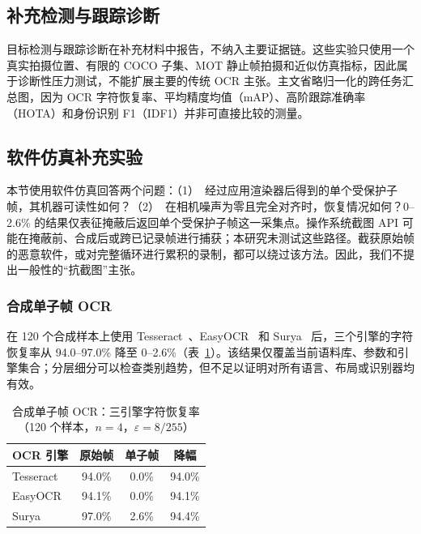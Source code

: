 \documentclass{ieeeaccess}
\begin{document}
\subsection{补充检测与跟踪诊断}

目标检测与跟踪诊断在补充材料中报告，不纳入主要证据链。这些实验只使用一个真实拍摄位置、有限的 COCO 子集、MOT 静止帧拍摄和近似仿真指标，因此属于诊断性压力测试，不能扩展主要的传统 OCR 主张。主文省略归一化的跨任务汇总图，因为 OCR 字符恢复率、平均精度均值（mAP）、高阶跟踪准确率（HOTA）和身份识别 F1（IDF1）并非可直接比较的测量。

\subsection{软件仿真补充实验}

本节使用软件仿真回答两个问题：（1）~经过应用渲染器后得到的单个受保护子帧，其机器可读性如何？（2）~在相机噪声为零且完全对齐时，恢复情况如何？0--2.6\% 的结果仅表征掩蔽后返回单个受保护子帧这一采集点。操作系统截图 API 可能在掩蔽前、合成后或跨已记录帧进行捕获；本研究未测试这些路径。截获原始帧的恶意软件，或对完整循环进行累积的录制，都可以绕过该方法。因此，我们不提出一般性的“抗截图”主张。

\subsubsection{合成单子帧 OCR}
在 120 个合成样本上使用 Tesseract~\cite{b_smith2007}、EasyOCR~\cite{b_easyocr2020} 和 Surya~\cite{b_surya2024} 后，三个引擎的字符恢复率从 94.0--97.0\% 降至 0--2.6\%（表~\ref{tab:ocr_corpus}）。该结果仅覆盖当前语料库、参数和引擎集合；分层细分可以检查类别趋势，但不足以证明对所有语言、布局或识别器均有效。

\begin{table}[!t]
\caption{合成单子帧 OCR：三引擎字符恢复率（120 个样本，$n=4$，$\varepsilon=8/255$）}
\label{tab:ocr_corpus}
\centering
\footnotesize
\begin{tabular}{lccc}
\toprule
OCR 引擎 & 原始帧 & 单子帧 & 降幅 \\
\midrule
Tesseract & 94.0\% & 0.0\% & 94.0\% \\
EasyOCR & 94.1\% & 0.0\% & 94.1\% \\
Surya & 97.0\% & 2.6\% & 94.4\% \\
\bottomrule
\end{tabular}
\end{table}
\end{document}
